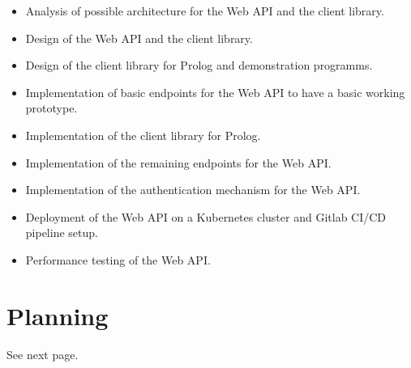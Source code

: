 \documentclass[en]{customTemplate}
\begin{document}
\begin{itemize}
    \item Analysis of possible architecture for the Web API and the client library.
    \item Design of the Web API and the client library.
    \item Design of the client library for Prolog and demonstration programms. 
    \item Implementation of basic endpoints for the Web API to have a basic working prototype.
    \item Implementation of the client library for Prolog.
    \item Implementation of the remaining endpoints for the Web API.
    \item Implementation of the authentication mechanism for the Web API.
    \item Deployment of the Web API on a Kubernetes cluster and Gitlab CI/CD pipeline setup.
    \item Performance testing of the Web API.
\end{itemize}

\section{Planning}   

See next page.

\fancyhf{}
\renewcommand{\headrulewidth}{0pt}

\begin{sidewaysfigure}
\end{sidewaysfigure}

\printglossary[type=\acronymtype]
\printglossary
\printbibliography{}
\end{document}
